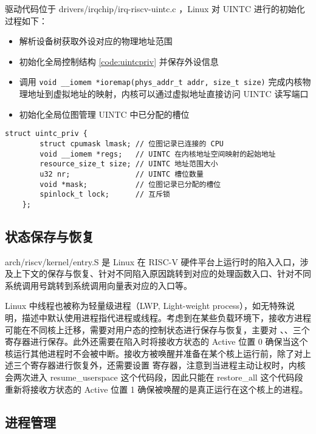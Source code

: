 驱动代码位于 drivers/irqchip/irq-riscv-uintc.c ，Linux 对 UINTC 进行的初始化过程如下：

\begin{itemize}
    \item 解析设备树获取外设对应的物理地址范围
    \item 初始化全局控制结构 \ref{code:uintcpriv} 并保存外设信息
    \item 调用 \texttt{void __iomem *ioremap(phys_addr_t addr, size_t size)} 完成内核物理地址到虚拟地址的映射，内核可以通过虚拟地址直接访问 UINTC 读写端口
    \item 初始化全局位图管理 UINTC 中已分配的槽位
\end{itemize}

\label{code:uintcpriv}
\begin{lstlisting}[style=CStyle]
    struct uintc_priv {
        struct cpumask lmask; // 位图记录已连接的 CPU
        void __iomem *regs;   // UINTC 在内核地址空间映射的起始地址
        resource_size_t size; // UINTC 地址范围大小
        u32 nr;               // UINTC 槽位数量
        void *mask;           // 位图记录已分配的槽位
        spinlock_t lock;      // 互斥锁
    };
\end{lstlisting}

\subsection{状态保存与恢复}

arch/riscv/kernel/entry.S 是 Linux 在 RISC-V 硬件平台上运行时的陷入入口，涉及上下文的保存与恢复、针对不同陷入原因跳转到对应的处理函数入口、针对不同系统调用号跳转到系统调用向量表对应的入口等。

Linux 中线程也被称为轻量级进程（LWP, Light-weight process）\cite{linuxbook}，如无特殊说明，描述中默认使用进程指代进程或线程。考虑到在某些负载环境下，接收方进程可能在不同核上迁移，需要对用户态的控制状态进行保存与恢复，主要对 \Rutvec 、\Ruscratch、\Ruepc 三个寄存器进行保存。此外还需要在陷入时将接收方状态的 Active 位置 0 确保当这个核运行其他进程时不会被中断。接收方被唤醒并准备在某个核上运行前，除了对上述三个寄存器进行恢复外，还需要设置 \Rsuirs 寄存器，注意到当进程主动让权时，内核会两次进入 resume\_userspace 这个代码段，因此只能在 restore\_all 这个代码段重新将接收方状态的 Active 位置 1 确保被唤醒的是真正运行在这个核上的进程。

\subsection{进程管理}

